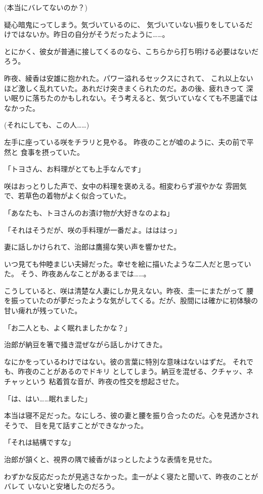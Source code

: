 ﻿\documentclass[
    book,tate,
    line_length=30zw,
    jafontsize=12pt,
    paper=b5j,
    landscape,
    ]{jlreq}
\begin{document}
(本当にバレてないのか？)

疑心暗鬼にってしまう。気づいているのに、
気づいていない振りをしているだけではないか。昨日の自分がそうだったように……。

とにかく、彼女が普通に接してくるのなら、こちらから打ち明ける必要はないだろう。

昨夜、綾香は安雄に抱かれた。パワー溢れるセックスにされて、
これ以上ないほど激しく乱れていた。あれだけ突きまくられたのだ。あの後、疲れきって
深い眠りに落ちたのかもしれない。そう考えると、気づいていなくても不思議ではなかった。

(それにしても、この人……)

左手に座っている咲をチラリと見やる。 昨夜のことが嘘のように、夫の前で平然と
食事を摂っていた。

「トヨさん、お料理がとても上手なんです」

咲はおっとりした声で、女中の料理を褒めえる。相変わらず淑やかな
雰囲気で、若草色の着物がよく似合っていた。

「あなたも、トヨさんのお漬け物が大好きなのよね」

「それはそうだが、咲の手料理が一番だよ。はははっ」

妻に話しかけられて、治郎は鷹揚な笑い声を響かせた。

いつ見ても仲睦まじい夫婦だった。幸せを絵に描いたような二人だと思っていた。
そう、昨夜あんなことがあるまでは……。

こうしていると、咲は清楚な人妻にしか見えない。昨夜、圭一にまたがって
腰を振っていたのが夢だったような気がしてくる。だが、股間には確かに初体験の甘い痺れが残っていた。

「お二人とも、よく眠れましたかな？」

治郎が納豆を箸で掻き混ぜながら話しかけてきた。

なにかをっているわけではない。彼の言葉に特別な意味はないはずだ。
それでも、昨夜のことがあるのでドキリ としてしまう。納豆を混ぜる、クチャッ、ネチャッという
粘着質な音が、昨夜の性交を想起させた。

「は、はい……眠れました」

本当は寝不足だった。なにしろ、彼の妻と腰を振り合ったのだ。心を見透かされそうで、
目を見て話すことができなかった。

「それは結構ですな」

治郎が頷くと、視界の隅で綾香がほっとしたような表情を見せた。

わずかな反応だったが見逃さなかった。圭一がよく寝たと聞いて、昨夜のことがバレて
いないと安堵したのだろう。
\end{document}
